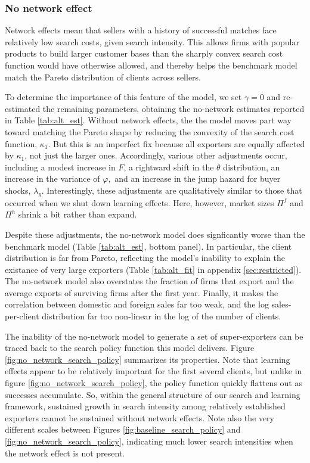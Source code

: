 \subsubsection{No network effect}

Network effects mean that sellers with a history of successful matches face
relatively low search costs, given search intensity. This allows firms with
popular products to build larger customer bases than the sharply convex
search cost function would have otherwise allowed, and thereby helps the
benchmark model match the Pareto distribution of clients across sellers.

To determine the importance of this feature of the model, we set $\gamma =0$
and re-estimated the remaining parameters, obtaining the no-network
estimates reported in Table \ref{tab:alt_est}. Without network effects, the the model moves part way toward matching the
Pareto shape by reducing the convexity of the search cost function, $\kappa
_{1}.$ But this is an imperfect fix because all exporters are equally
affected by $\kappa _{1}$, not just the larger ones. Accordingly, various
other adjustments occur, including a modest increase in $F$, a rightward
shift in the $\theta $ distribution, an increase in the variance of $\varphi
,$ and an increase in the jump hazard for buyer shocks, $\lambda _{y}.$
Interestingly, these adjustments are qualitatively similar to those that
occurred when we shut down learning effects. Here, however, market sizes $%
\Pi ^{f}$ and $\Pi ^{h}$ shrink a bit rather than expand.

Despite these adjustments, the no-network model does signficantly worse than
the benchmark model (Table \ref{tab:alt_est}, bottom panel). In particular,
the client distribution is far from Pareto, reflecting the model's inability
to explain the existance of very large exporters (Table \ref{tab:alt_fit} in
appendix \ref{sec:restricted}). The no-network model also overstates the
fraction of firms that export and the average exports of surviving firms
after the first year. Finally, it makes the correlation between domestic and
foreign sales far too weak, and the log sales-per-client distribution far
too non-linear in the log of the number of clients.

The inability of the no-network model to generate a set of super-exporters
can be traced back to the search policy function this model delivers. Figure %
\ref{fig:no_network_search_policy} summarizes its properties. Note that
learning effects appear to be relatively important for the first several
clients, but unlike in figure \ref{fig:no_network_search_policy}, the policy
function quickly flattens out as successes accumulate. So, within the
general structure of our search and learning framework, sustained growth in
search intensity among relatively established exporters cannot be sustained
without network effects. Note also the very different scales between Figures %
\ref{fig:baseline_search_policy} and \ref{fig:no_network_search_policy},
indicating much lower search intensities when the network effect is not
present.

